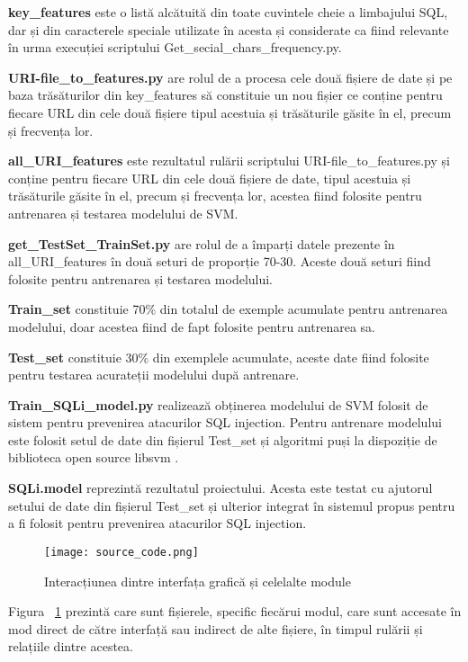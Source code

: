 \textbf{key\_features} este  o listă alcătuită din toate cuvintele cheie a limbajului SQL, dar și din caracterele speciale utilizate în acesta și considerate ca fiind relevante în urma execuției scriptului  Get\_secial\_chars\_frequency.py.

\textbf{URI-file\_to\_features.py}  are rolul de a procesa cele două fișiere de date și pe baza trăsăturilor din  key\_features  să constituie un nou fișier ce conține pentru fiecare URL din cele două fișiere tipul acestuia și trăsăturile găsite în el, precum și frecvența lor.

\textbf{all\_URI\_features} este rezultatul rulării scriptului URI-file\_to\_features.py  și conține pentru fiecare URL din cele două fișiere de date, tipul acestuia și trăsăturile găsite în el, precum și frecvența lor, acestea fiind folosite pentru antrenarea și testarea modelului de SVM. 

\textbf{get\_TestSet\_TrainSet.py}  are rolul de a împarți datele prezente în  all\_URI\_features  în două seturi de proporție 70-30. Aceste două seturi fiind folosite pentru antrenarea și testarea modelului. 

\textbf{Train\_set} constituie 70\% din totalul de exemple acumulate pentru antrenarea modelului, doar acestea fiind de fapt folosite pentru antrenarea sa. 

\textbf{Test\_set} constituie 30\%  din exemplele acumulate, aceste date fiind folosite pentru testarea acurateții modelului după antrenare. 

\textbf{Train\_SQLi\_model.py} realizează obținerea modelului de SVM folosit de sistem pentru prevenirea atacurilor SQL injection. Pentru antrenare modelului este folosit setul de date din fișierul Test\_set și algoritmi puși la dispoziție de biblioteca open source libsvm  \cite{libsvm}.

\textbf{SQLi.model}  reprezintă rezultatul proiectului. Acesta este testat cu ajutorul setului de date din fișierul Test\_set și ulterior integrat în sistemul propus pentru a fi folosit pentru prevenirea atacurilor SQL injection. 

\newpage

\begin{figure}[h]
	\centering
	\texttt{[image: source\_code.png]}
	\caption{ Interacțiunea dintre interfața grafică și celelalte module }
	\label{fig:source_code}
\end{figure}
Figura ~\ref{fig:source_code}  prezintă care sunt fișierele, specific fiecărui modul, care sunt accesate în mod direct de către interfață sau indirect de alte fișiere, în timpul rulării și relațiile dintre acestea. \\


